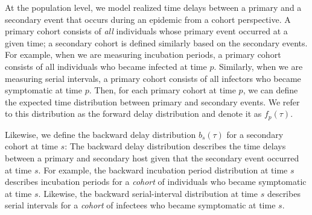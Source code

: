 \documentclass[12pt]{article}
\newcommand{\psymp}{\ensuremath{p}} %
\newcommand{\ssymp}{\ensuremath{s}} %
\begin{document}
At the population level, we model realized time delays between a primary and a secondary event that occurs during an epidemic from a cohort perspective.
A primary cohort consists of \emph{all} individuals whose primary event occurred at a given time; 
a secondary cohort is defined similarly based on the secondary events.
For example, when we are measuring incubation periods, a primary cohort consists of all individuals who became infected at time $\psymp$.
Similarly, when we are measuring serial intervals, a primary cohort consists of all infectors who became symptomatic at time $\psymp$.
Then, for each primary cohort at time $\psymp$, we can define the expected time distribution between primary and secondary events.
We refer to this distribution as the forward delay distribution and denote it as $f_\psymp(\tau)$.

Likewise, we define the backward delay distribution $b_\ssymp(\tau)$ for a secondary cohort at time $\ssymp$:
The backward delay distribution describes the time delays between a primary and secondary host given that the secondary event occurred at time $\ssymp$.
For example, the backward incubation period distribution at time $\ssymp$ describes incubation periods for a \emph{cohort} of individuals who became symptomatic at time $\ssymp$.
Likewise, the backward serial-interval distribution at time $\ssymp$ describes serial intervals for a \emph{cohort} of infectees who became symptomatic at time $\ssymp$.
\end{document}
